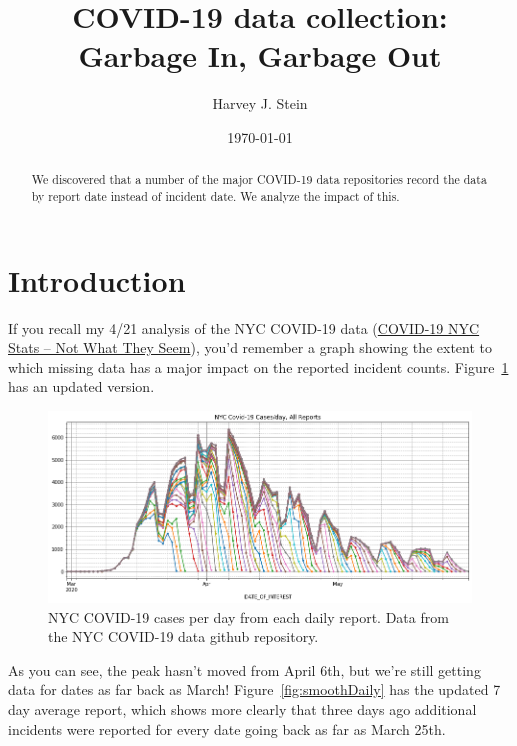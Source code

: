 \documentclass[10pt,reqno]{amsart}
\author{Harvey J. Stein}
\date{\today}
\begin{document}
\title{COVID-19 data collection: Garbage In, Garbage Out}

\begin{abstract}
  We discovered that a number of the major COVID-19 data repositories
  record the data by report date instead of incident date.  We analyze
  the impact of this.
\end{abstract}

\maketitle
\tableofcontents

\section{Introduction}
\label{sec:intro}
If you recall my 4/21 analysis of the NYC COVID-19 data
(\href{https://hjstein.blogspot.com/2020/04/covid-19-nyc-stats-not-what-they-seem.html}{COVID-19 NYC Stats -- Not What They Seem}),
you'd remember a graph showing the extent to which missing
data has a major impact on the reported incident
counts.\nocite{nyc2020data,Stein2020nycdata,Stein2020owiddata,owid2020data}
Figure~\ref{fig:daily} has an updated version.\nocite{Stein2020Seem}\nocite{Stein2020Ray}

\begin{figure}[H]
  \centering
  \includegraphics[width=\textwidth]{../Notebooks/theFullStory.png}
  \caption{NYC COVID-19 cases per day from each daily report.  Data
    from the NYC COVID-19 data github repository.}
  \label{fig:daily}
\end{figure}

As you can see, the peak hasn't moved from April 6th, but we're still
getting data for dates as far back as March!
Figure~\ref{fig:smoothDaily} has the updated 7 day average report,
which shows more clearly that three days ago additional incidents were
reported for every date going back as far as March 25th.
\end{document}
